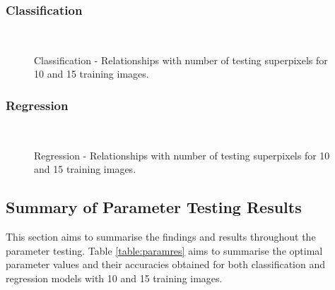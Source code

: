 \subsubsection{Classification}
\begin{figure}[H]
    \centering
    \\
    \caption{Classification - Relationships with number of testing superpixels for 10 and 15 training images.}%
    \label{class:testpix}
\end{figure}

\subsubsection{Regression}
\begin{figure}[H]
    \centering
    \\
    \caption{Regression - Relationships with number of testing superpixels for 10 and 15 training images.}%
    \label{reg:testpix}
\end{figure}

\subsection{Summary of Parameter Testing Results}
This section aims to summarise the findings and results throughout the parameter testing. Table \ref{table:paramres} aims to summarise the optimal parameter values and their accuracies obtained for both classification and regression models with 10 and 15 training images.


